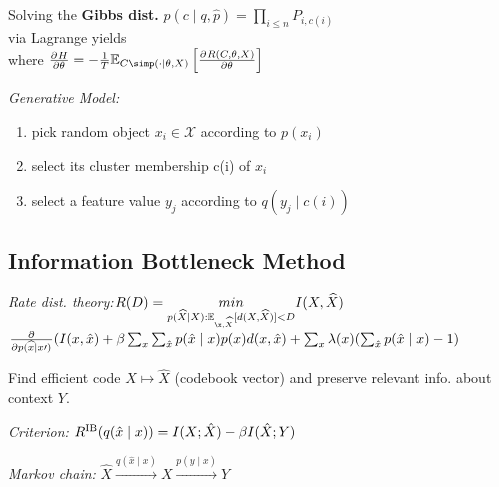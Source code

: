 Solving the \textbf{Gibbs dist.} $p(c \mid q, \hat p) = \prod_{i\leq n} P_{i, c(i)}$\\
via Lagrange yields 
{\color{gray}\scriptsize {}}\\
where $\pderiv{H}{\theta} = - \frac1T \mathbb{E}_{C\simp(\cdot\mid\theta, X)}\left[\pderiv{R(C,\theta, X)}{\theta}\right]$

\emph{Generative Model:}
\begin{enumerate}
    \item pick random object $x_i\in\mathcal{X}$ according to $p(x_i)$
    \item select its cluster membership c(i) of $x_i$
    \item select a feature value $y_j$ according to $q(y_j\mid c(i))$
\end{enumerate}
\subsection{Information Bottleneck Method}
\emph{Rate dist. theory:}\enskip $R(D)=\underset{p(\widehat{X}\mid X): \mathbb{E}_{\x,\widehat{X}}[d(X,\widehat{X})]<D}{min}I(X, \widehat{X})$\\
$\pderiv{}{p(\widehat{x}\mid x\prime)}(I(x, \hat{x})+\beta\sum_x\sum_{\hat{x}}p(\hat{x}\mid x)p(x)d(x,\hat{x}) \newline +\sum_x\lambda(x)(\sum_{\hat{x}}p(\hat{x}\mid x)-1)$

Find efficient code $X \mapsto \hat X$ (codebook vector) and preserve relevant info. about context $Y$.

\emph{Criterion:}\enskip
$R^\mathrm{IB}(q(\hat x\mid x)) = I(X; \hat X) - \beta I(\hat X; Y)$

\emph{Markov chain:}\enskip
$\hat X \xrightarrow{q(\hat x\mid x)} X \xrightarrow{p(y\mid x)} Y$

